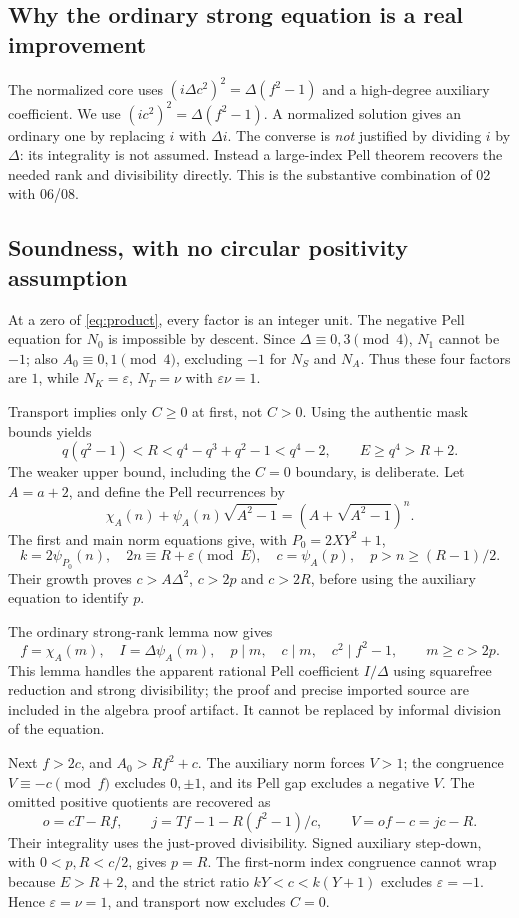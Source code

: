 \documentclass[11pt]{article}
\begin{document}
\subsection{Why the ordinary strong equation is a real improvement}
The normalized core uses $(i\Delta c^2)^2=\Delta(f^2-1)$ and a high-degree auxiliary coefficient. We use $(ic^2)^2=\Delta(f^2-1)$. A normalized solution gives an ordinary one by replacing $i$ with $\Delta i$. The converse is \emph{not} justified by dividing $i$ by $\Delta$: its integrality is not assumed. Instead a large-index Pell theorem recovers the needed rank and divisibility directly. This is the substantive combination of 02 with 06/08.

\subsection{Soundness, with no circular positivity assumption}
At a zero of \eqref{eq:product}, every factor is an integer unit. The negative Pell equation for $N_0$ is impossible by descent. Since $\Delta\equiv0,3\pmod4$, $N_1$ cannot be $-1$; also $A_0\equiv0,1\pmod4$, excluding $-1$ for $N_S$ and $N_A$. Thus these four factors are $1$, while $N_K=\varepsilon$, $N_T=\nu$ with $\varepsilon\nu=1$.

Transport implies only $C\ge0$ at first, not $C>0$. Using the authentic mask bounds yields
\[
q(q^2-1)<R<q^4-q^3+q^2-1<q^4-2,
\qquad E\ge q^4>R+2.
\]
The weaker upper bound, including the $C=0$ boundary, is deliberate.
Let $A=a+2$, and define the Pell recurrences by
\[
\chi_A(n)+\psi_A(n)\sqrt{A^2-1}
=(A+\sqrt{A^2-1})^n.
\]
The first and main norm equations give, with $P_0=2XY^2+1$,
\[
k=2\psi_{P_0}(n),\quad
2n\equiv R+\varepsilon\pmod E,\quad
c=\psi_A(p),\quad p>n\ge(R-1)/2.
\]
Their growth proves $c>A\Delta^2$, $c>2p$ and $c>2R$, before using the auxiliary equation to identify $p$.

The ordinary strong-rank lemma now gives
\[
f=\chi_A(m),\quad I=\Delta\psi_A(m),\quad
p\mid m,\quad c\mid m,\quad c^2\mid f^2-1,
\qquad m\ge c>2p.
\]
This lemma handles the apparent rational Pell coefficient $I/\Delta$ using squarefree reduction and strong divisibility; the proof and precise imported source are included in the algebra proof artifact. It cannot be replaced by informal division of the equation.

Next $f>2c$, and $A_0>Rf^2+c$. The auxiliary norm forces $V>1$; the congruence $V\equiv-c\pmod f$ excludes $0,\pm1$, and its Pell gap excludes a negative $V$. The omitted positive quotients are recovered as
\[
o=cT-Rf,\qquad j=Tf-1-R(f^2-1)/c,
\qquad V=of-c=jc-R.
\]
Their integrality uses the just-proved divisibility. Signed auxiliary step-down, with $0<p,R<c/2$, gives $p=R$. The first-norm index congruence cannot wrap because $E>R+2$, and the strict ratio $kY<c<k(Y+1)$ excludes $\varepsilon=-1$. Hence $\varepsilon=\nu=1$, and transport now excludes $C=0$.
\end{document}
